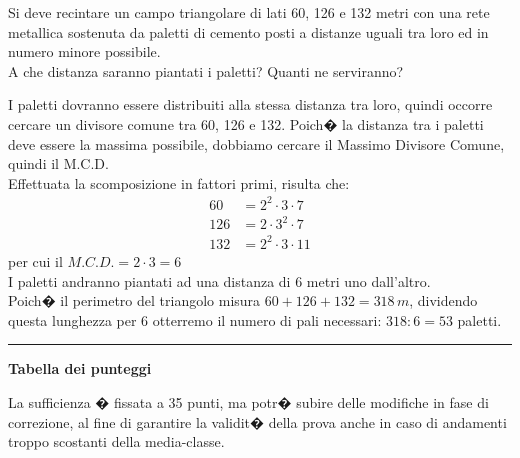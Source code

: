 \documentclass[11pt, a4paper, answers]{exam}
\begin{document}
\begin{questions}
%
%

\vspace{10pt}

Si deve recintare un campo triangolare di lati 60, 126 e 132 metri con una rete metallica
sostenuta da paletti di cemento posti a distanze uguali tra loro ed in numero minore possibile. \\A
che distanza saranno piantati i paletti? Quanti ne serviranno?


\begin{solution}
I paletti dovranno essere distribuiti alla stessa distanza tra loro, quindi occorre cercare un divisore comune tra 60, 126 e 132. Poich� la distanza tra i paletti deve essere la massima possibile, dobbiamo cercare il Massimo Divisore Comune, quindi il M.C.D.\\
Effettuata la scomposizione in fattori primi, risulta che:\\
\begin{align*}
	60 & = 2^2 \cdot 3 \cdot 7\\
	126 & = 2 \cdot 3^2 \cdot 7\\
	132 & = 2^2 \cdot 3 \cdot 11
\end{align*}
per cui il \(M.C.D. = 2 \cdot 3 = \boxed{6}\)\\

I paletti andranno piantati ad una distanza di 6 metri uno dall'altro.\\

Poich� il perimetro del triangolo misura \(60 + 126 + 132 = 318 \, m\), dividendo questa lunghezza per 6 otterremo il numero di pali necessari: \(318 : 6 = \boxed{53}\) paletti.
\end{solution}

\end{questions}
\vspace{5pt}
\noindent
\rule[2ex]{\textwidth}{1pt}
\begin{center}
{\bf Tabella dei punteggi}
\vspace{10pt}

\combinedgradetable[h][questions]
\end{center}
\vspace{4pt}
\footnotesize La sufficienza � fissata a 35 punti, ma potr� subire delle modifiche in fase di correzione, al fine di garantire la validit� della prova anche in caso di andamenti troppo scostanti della media-classe.
\end{document}
